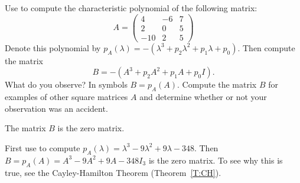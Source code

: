 \documentclass{ximera}
\begin{document}
\begin{exercise} \label{c10.2.10}
Use \Matlab to compute the characteristic polynomial of the following
matrix:
\[
A = \left( \begin{array}{rrr}
 4 & -6 & 7\\
 2 & 0 & 5\\
-10 & 2 & 5
\end{array} \right)
\]
Denote this polynomial by $p_A(\lambda) = 
-(\lambda^3 + p_2 \lambda^2 + p_1 \lambda + p_0)$.  Then compute
the matrix
\[
B = -(A^3 + p_2 A^2 + p_1 A + p_0 I).
\]
What do you observe?  In symbols $B=p_A(A)$.  Compute the matrix $B$ for
examples of other square matrices $A$ and determine whether or not 
your observation was an accident.

\begin{solution}

\ans The matrix $B$ is the zero matrix.

\soln First use \Matlab to compute
$p_A(\lambda) = \lambda^3 - 9\lambda^2 + 9\lambda - 348$.  Then
$B = p_A(A) = A^3 - 9A^2 + 9A - 348I_3$ is the zero matrix.  To
see why this is true, see the Cayley-Hamilton Theorem
(Theorem~\ref{T:CH}).



\end{solution}
\end{exercise}
\end{document}
